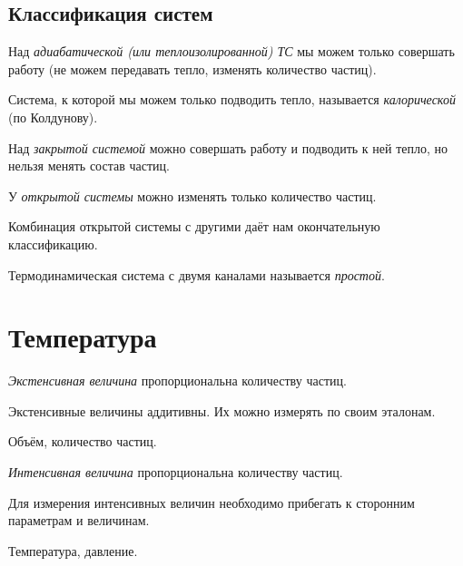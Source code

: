 \documentclass[../main.tex]{subfiles}
\begin{document}
    \subsection{Классификация систем}
        \begin{definition}
            Над \emph{адиабатической (или теплоизолированной) ТС} мы можем только совершать работу (не можем передавать тепло, изменять количество частиц).
        \end{definition}    
        \begin{definition}
            Система, к которой мы можем только подводить тепло, называется \emph{калорической} (по Колдунову).
        \end{definition}
        \begin{definition}
            Над \emph{закрытой системой} можно совершать работу и подводить к ней тепло, но нельзя менять состав частиц.
        \end{definition}
        \begin{definition}
            У \emph{открытой системы} можно изменять только количество частиц. 
        \end{definition}
        \begin{note}
            Комбинация открытой системы с другими даёт нам окончательную классификацию.
        \end{note}

        \begin{definition}
            Термодинамическая система с двумя каналами называется \emph{простой}.
        \end{definition}
       

        \section{Температура}
        \begin{definition}
            \emph{Экстенсивная величина} пропорциональна количеству частиц.
        \end{definition}
        \begin{note}
            Экстенсивные величины аддитивны. Их можно измерять по своим эталонам.
        \end{note}
        \begin{examples}
            Объём, количество частиц.
        \end{examples}

        \begin{definition}
            \emph{Интенсивная величина} пропорциональна количеству частиц.
        \end{definition}
        \begin{note}
            Для измерения интенсивных величин необходимо прибегать к сторонним параметрам и величинам.
        \end{note}
        \begin{examples}
            Температура, давление.
        \end{examples}
\end{document}
